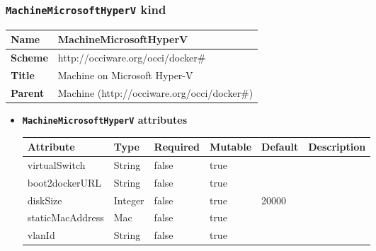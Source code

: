 \subsubsection{\texttt{MachineMicrosoftHyperV} kind}
\begin{center}
\begin{tabular}{|l|l|}
  \hline
  \textbf{Name} & MachineMicrosoftHyperV \\
  \hline  
  \textbf{Scheme} & http://occiware.org/occi/docker\# \\
  \hline
  \textbf{Title} & Machine on Microsoft Hyper-V \\
  \hline
  \textbf{Parent} & Machine (http://occiware.org/occi/docker\#) \\
  \hline
\end{tabular}
\end{center}
\begin{itemize}
\item \textbf{\texttt{MachineMicrosoftHyperV} attributes}

\begin{tabularx}{\textwidth}{|l|l|p{1.4cm}|p{1.3cm}|l|X|}
  \hline
  \textbf{Attribute} & \textbf{Type} & \textbf{Required} & \textbf{Mutable} & \textbf{Default} & \textbf{Description} \\
  \hline  
  virtualSwitch & String & false & true &  &  \\
  \hline
  boot2dockerURL & String & false & true &  &  \\
  \hline
  diskSize & Integer & false & true & 20000 &  \\
  \hline
  staticMacAddress & Mac & false & true &  &  \\
  \hline
  vlanId & String & false & true &  &  \\
  \hline
\end{tabularx}
\end{itemize}



